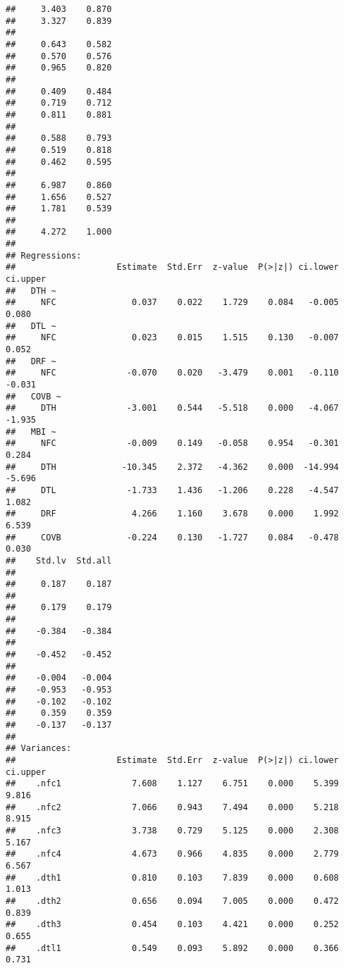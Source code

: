 \documentclass[
  english,
  man]{apa6}
\begin{document}
\begin{verbatim}
##     3.403    0.870
##     3.327    0.839
##                   
##     0.643    0.582
##     0.570    0.576
##     0.965    0.820
##                   
##     0.409    0.484
##     0.719    0.712
##     0.811    0.881
##                   
##     0.588    0.793
##     0.519    0.818
##     0.462    0.595
##                   
##     6.987    0.860
##     1.656    0.527
##     1.781    0.539
##                   
##     4.272    1.000
## 
## Regressions:
##                    Estimate  Std.Err  z-value  P(>|z|) ci.lower ci.upper
##   DTH ~                                                                 
##     NFC               0.037    0.022    1.729    0.084   -0.005    0.080
##   DTL ~                                                                 
##     NFC               0.023    0.015    1.515    0.130   -0.007    0.052
##   DRF ~                                                                 
##     NFC              -0.070    0.020   -3.479    0.001   -0.110   -0.031
##   COVB ~                                                                
##     DTH              -3.001    0.544   -5.518    0.000   -4.067   -1.935
##   MBI ~                                                                 
##     NFC              -0.009    0.149   -0.058    0.954   -0.301    0.284
##     DTH             -10.345    2.372   -4.362    0.000  -14.994   -5.696
##     DTL              -1.733    1.436   -1.206    0.228   -4.547    1.082
##     DRF               4.266    1.160    3.678    0.000    1.992    6.539
##     COVB             -0.224    0.130   -1.727    0.084   -0.478    0.030
##    Std.lv  Std.all
##                   
##     0.187    0.187
##                   
##     0.179    0.179
##                   
##    -0.384   -0.384
##                   
##    -0.452   -0.452
##                   
##    -0.004   -0.004
##    -0.953   -0.953
##    -0.102   -0.102
##     0.359    0.359
##    -0.137   -0.137
## 
## Variances:
##                    Estimate  Std.Err  z-value  P(>|z|) ci.lower ci.upper
##    .nfc1              7.608    1.127    6.751    0.000    5.399    9.816
##    .nfc2              7.066    0.943    7.494    0.000    5.218    8.915
##    .nfc3              3.738    0.729    5.125    0.000    2.308    5.167
##    .nfc4              4.673    0.966    4.835    0.000    2.779    6.567
##    .dth1              0.810    0.103    7.839    0.000    0.608    1.013
##    .dth2              0.656    0.094    7.005    0.000    0.472    0.839
##    .dth3              0.454    0.103    4.421    0.000    0.252    0.655
##    .dtl1              0.549    0.093    5.892    0.000    0.366    0.731

\end{verbatim}
\end{document}
